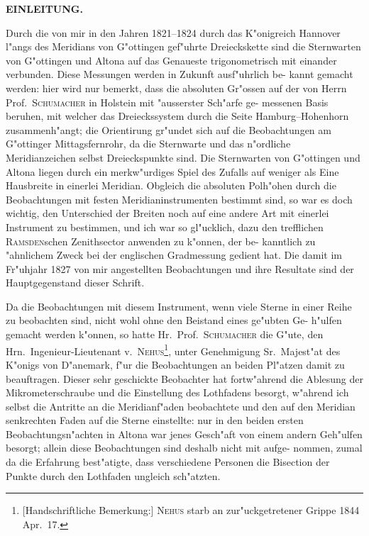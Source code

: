 \documentclass[12pt,a4paper]{article}
\theoremstyle{plain}
\theoremstyle{definition}
\theoremstyle{remark}
\begin{document}
\vspace{0.5cm}
\begin{center}
{\large\bfseries EINLEITUNG.}
\end{center}
\vspace{0.3cm}

Durch die von mir in den Jahren 1821--1824 durch das K"onigreich
Hannover l"angs des Meridians von G"ottingen gef"uhrte Dreieckskette sind die
Sternwarten von G"ottingen und Altona auf das Genaueste trigonometrisch mit
einander verbunden. Diese Messungen werden in Zukunft ausf"uhrlich be-
kannt gemacht werden: hier wird nur bemerkt, dass die absoluten Gr"ossen
auf der von Herrn Prof.~\textsc{Schumacher} in Holstein mit "ausserster Sch"arfe ge-
messenen Basis beruhen, mit welcher das Dreieckssystem durch die Seite
Hamburg--Hohenhorn zusammenh"angt; die Orientirung gr"undet sich auf die
Beobachtungen am G"ottinger Mittagsfernrohr, da die Sternwarte und das
n"ordliche Meridianzeichen selbst Dreieckspunkte sind. Die Sternwarten von
G"ottingen und Altona liegen durch ein merkw"urdiges Spiel des Zufalls auf
weniger als Eine Hausbreite in einerlei Meridian. Obgleich die absoluten
Polh"ohen durch die Beobachtungen mit festen Meridianinstrumenten bestimmt
sind, so war es doch wichtig, den Unterschied der Breiten noch auf eine
andere Art mit einerlei Instrument zu bestimmen, und ich war so gl"ucklich,
dazu den trefflichen \textsc{Ramsden}schen Zenithsector anwenden zu k"onnen, der be-
kanntlich zu "ahnlichem Zweck bei der englischen Gradmessung gedient hat.
Die damit im Fr"uhjahr 1827 von mir angestellten Beobachtungen und ihre
Resultate sind der Hauptgegenstand dieser Schrift.

Da die Beobachtungen mit diesem Instrument, wenn viele Sterne in einer
Reihe zu beobachten sind, nicht wohl ohne den Beistand eines ge"ubten Ge-
h"ulfen gemacht werden k"onnen, so hatte Hr.~Prof.~\textsc{Schumacher} die G"ute,
den Hrn.~Ingenieur-Lieutenant v.~\textsc{Nehus}\footnote{[Handschriftliche Bemerkung:] \textsc{Nehus} starb an zur"uckgetretener Grippe 1844 Apr.~17.},
unter Genehmigung Sr.~Majest"at
des K"onigs von D"anemark, f"ur die Beobachtungen an beiden Pl"atzen damit zu
beauftragen. Dieser sehr geschickte Beobachter hat fortw"ahrend die Ablesung
der Mikrometerschraube und die Einstellung des Lothfadens besorgt, w"ahrend
ich selbst die Antritte an die Meridianf"aden beobachtete und den auf den
Meridian senkrechten Faden auf die Sterne einstellte: nur in den beiden
ersten Beobachtungsn"achten in Altona war jenes Gesch"aft von einem andern
Geh"ulfen besorgt; allein diese Beobachtungen sind deshalb nicht mit aufge-
nommen, zumal da die Erfahrung best"atigte, dass verschiedene Personen die
Bisection der Punkte durch den Lothfaden ungleich sch"atzten.
\end{document}
